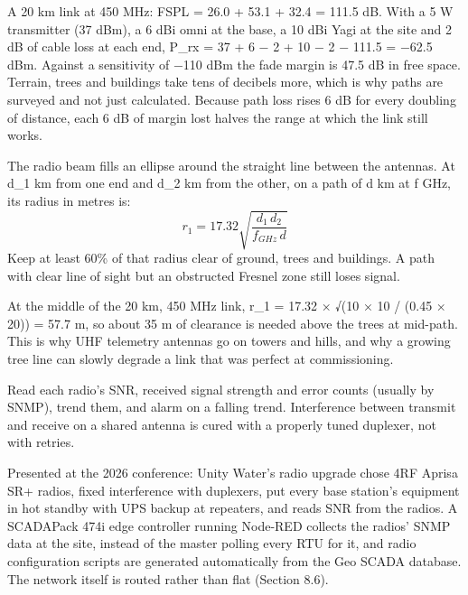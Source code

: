 A 20 km link at 450 MHz: FSPL = 26.0 + 53.1 + 32.4 = 111.5 dB. With a 5 W transmitter (37 dBm), a 6 dBi omni at the base, a 10 dBi Yagi at the site and 2 dB of cable loss at each end, P\_rx = 37 + 6 − 2 + 10 − 2 − 111.5 = −62.5 dBm. Against a sensitivity of −110 dBm the fade margin is 47.5 dB in free space. Terrain, trees and buildings take tens of decibels more, which is why paths are surveyed and not just calculated. Because path loss rises 6 dB for every doubling of distance, each 6 dB of margin lost halves the range at which the link still works.

 The radio beam fills an ellipse around the straight line between the antennas. At d\_1 km from one end and d\_2 km from the other, on a path of d km at f GHz, its radius in metres is:
\[ r_1 = 17.32 \sqrt{\frac{d_1\, d_2}{f_{GHz}\, d}} \]
Keep at least 60\% of that radius clear of ground, trees and buildings. A path with clear line of sight but an obstructed Fresnel zone still loses signal.

 At the middle of the 20 km, 450 MHz link, r\_1 = 17.32 × √(10 × 10 / (0.45 × 20)) = 57.7 m, so about 35 m of clearance is needed above the trees at mid-path. This is why UHF telemetry antennas go on towers and hills, and why a growing tree line can slowly degrade a link that was perfect at commissioning.

 Read each radio's SNR, received signal strength and error counts (usually by SNMP), trend them, and alarm on a falling trend. Interference between transmit and receive on a shared antenna is cured with a properly tuned duplexer, not with retries.

 Presented at the 2026 conference: Unity Water's radio upgrade chose 4RF Aprisa SR+ radios, fixed interference with duplexers, put every base station's equipment in hot standby with UPS backup at repeaters, and reads SNR from the radios. A SCADAPack 474i edge controller running Node-RED collects the radios' SNMP data at the site, instead of the master polling every RTU for it, and radio configuration scripts are generated automatically from the Geo SCADA database. The network itself is routed rather than flat (Section 8.6).

